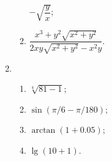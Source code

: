 \documentclass[a4paper, 11pt]{ctexart}
\begin{document}
\begin{enumerate}
\begin{enumerate}[(1)]
                $-\sqrt{\dfrac yx}$;
            \item %
                $\dfrac{x^3 + y^2\sqrt{x^2+y^2}}{2xy\sqrt{x^2+y^2} - x^2y}$.
        \end{enumerate}
    \item %
        \begin{enumerate}[(1)]
            \item %
                $\sqrt[4]{81 - 1}$;
            \item %
                $\sin(\pi/6 - \pi/180)$;
            \item %
                $\arctan(1 + 0.05)$;
            \item %
                $\lg(10 + 1)$.
        \end{enumerate}
\end{enumerate}
\end{document}
